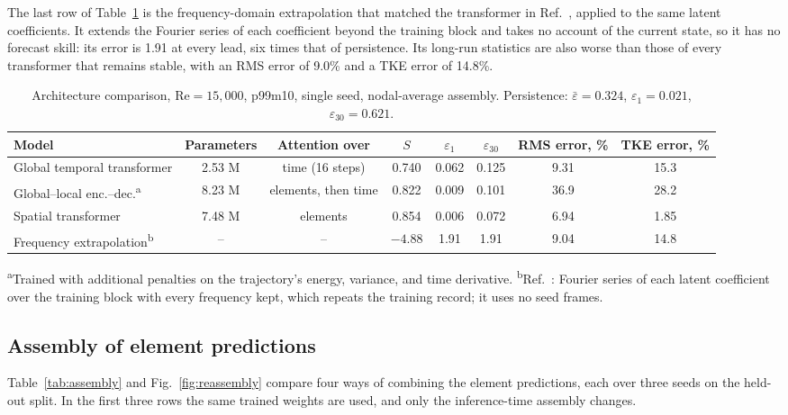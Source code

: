 \documentclass[conf]{new-aiaa}
\newcommand{\Rey}{\mathrm{Re}}
\begin{document}
The last row of Table~\ref{tab:arch} is the frequency-domain extrapolation that matched the transformer in Ref.~\cite{morton2026scitech}, applied to the same latent coefficients. It extends the Fourier series of each coefficient beyond the training block and takes no account of the current state, so it has no forecast skill: its error is 1.91 at every lead, six times that of persistence. Its long-run statistics are also worse than those of every transformer that remains stable, with an RMS error of 9.0\% and a TKE error of 14.8\%.

\begin{table}[!tbp]
  \centering
  \small
  \caption{Architecture comparison, $\Rey=15{,}000$, p99m10, single seed, nodal-average assembly. Persistence: $\bar\varepsilon=0.324$, $\varepsilon_{1}=0.021$, $\varepsilon_{30}=0.621$.}
  \label{tab:arch}
  \begin{tabular}{lccccccc}
    \toprule
    Model & Parameters & Attention over & $S$ & $\varepsilon_{1}$ & $\varepsilon_{30}$ & RMS error, \% & TKE error, \% \\
    \midrule
    Global temporal transformer & 2.53 M & time (16 steps) & 0.740 & 0.062 & 0.125 & 9.31 & 15.3 \\
    Global--local enc.--dec.\textsuperscript{a} & 8.23 M & elements, then time & 0.822 & 0.009 & 0.101 & 36.9 & 28.2 \\
    Spatial transformer & 7.48 M & elements & 0.854 & 0.006 & 0.072 & 6.94 & 1.85 \\
    \midrule
    Frequency extrapolation\textsuperscript{b} & -- & -- & $-4.88$ & 1.91 & 1.91 & 9.04 & 14.8 \\
    \bottomrule
  \end{tabular}

  \smallskip
  {\footnotesize \textsuperscript{a}Trained with additional penalties on the trajectory's energy, variance, and time derivative. \textsuperscript{b}Ref.~\cite{morton2026scitech}: Fourier series of each latent coefficient over the training block with every frequency kept, which repeats the training record; it uses no seed frames.}
\end{table}

\subsection{Assembly of element predictions}
\label{sec:res_assembly}
Table~\ref{tab:assembly} and Fig.~\ref{fig:reassembly} compare four ways of combining the element predictions, each over three seeds on the held-out split. In the first three rows the same trained weights are used, and only the inference-time assembly changes.
\end{document}

